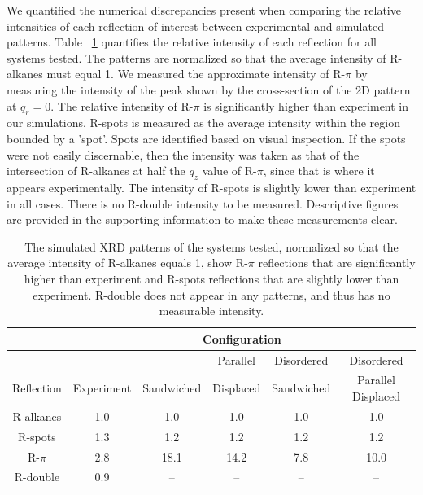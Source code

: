 \documentclass[journal=jpcbfk,manusciprt=article]{achemso}
\begin{document}
  We quantified the numerical discrepancies present when comparing the relative intensities
  of each reflection of interest between experimental and simulated patterns. Table 
  ~\ref{table:relative_inensities_300K} quantifies the relative intensity of each reflection for 
  all systems tested. The patterns are normalized so that the average intensity of R-alkanes 
  must equal 1.
  We measured the approximate intensity of R-$\pi$ by measuring the intensity of the peak shown
  by the cross-section of the 2D pattern at $q_r=0$. The relative intensity of R-$\pi$ is 
  significantly higher than experiment in our simulations. R-spots is measured as the average
  intensity within the region bounded by a 'spot'. Spots are identified based on visual 
  inspection. If the spots were not easily discernable, then the intensity was taken as that of
  the intersection of R-alkanes at half the $q_z$ value of R-$\pi$, since that is where it 
  appears experimentally. The intensity of R-spots is slightly lower than experiment in all 
  cases. There is no R-double intensity to be measured. Descriptive figures are provided in the
  supporting information to make these measurements clear.

  \begin{table}[h]
  \centering
  \begin{tabular}{c|ccccc}
  \toprule
 		   & \multicolumn{5}{c}{Configuration} \\
  \hline
             &            &            & Parallel  & Disordered & Disordered         \\
  Reflection & Experiment & Sandwiched & Displaced & Sandwiched & Parallel Displaced \\
  \midrule
  R-alkanes & 1.0 &  1.0 &  1.0 & 1.0 & 1.0  \\  
  R-spots   & 1.3 &  1.2 &  1.2 & 1.2 & 1.2  \\
  R-$\pi$   & 2.8 & 18.1 & 14.2 & 7.8 & 10.0 \\
  R-double  & 0.9 &  --  & --   &  -- & --   \\ 
  \bottomrule
  \end{tabular}
  \caption{The simulated XRD patterns of the systems tested, normalized so that the average 
  intensity of R-alkanes equals 1, show R-$\pi$ reflections that are significantly higher 
  than experiment and R-spots reflections that are slightly lower than experiment. R-double
  does not appear in any patterns, and thus has no measurable intensity.}
  \label{table:relative_inensities_300K} 
  \end{table}
  
\end{document}

